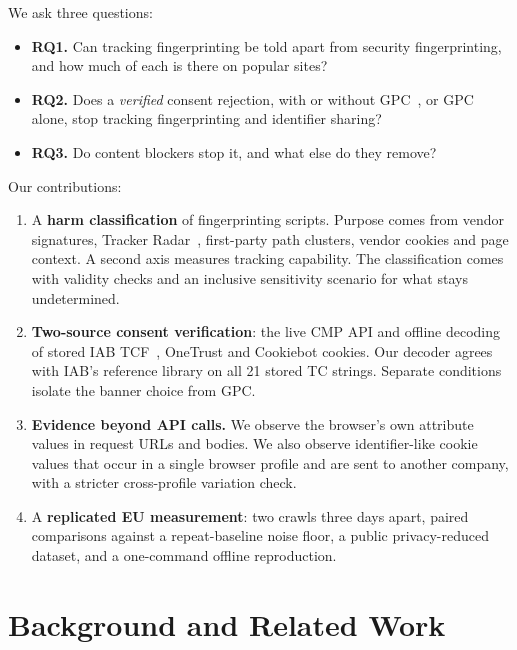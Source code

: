 \documentclass[sigconf,review,anonymous]{acmart}
\begin{document}
We ask three questions:
\begin{itemize}
\item \textbf{RQ1.} Can tracking fingerprinting be told apart from security fingerprinting, and
  how much of each is there on popular sites?
\item \textbf{RQ2.} Does a \emph{verified} consent rejection, with or without GPC~\cite{gpcspec},
  or GPC alone, stop tracking fingerprinting and identifier sharing?
\item \textbf{RQ3.} Do content blockers stop it, and what else do they remove?
\end{itemize}

\noindent Our contributions:
\begin{enumerate}
\item A \textbf{harm classification} of fingerprinting scripts. Purpose comes from vendor
  signatures, Tracker Radar~\cite{trackerradar}, first-party path clusters, vendor cookies and
  page context. A second axis measures tracking capability. The classification comes with
  validity checks and an inclusive sensitivity scenario for what stays undetermined.
\item \textbf{Two-source consent verification}: the live CMP API and offline decoding of stored
  IAB TCF~\cite{iabtcf}, OneTrust and Cookiebot cookies. Our decoder agrees with IAB's reference
  library on all 21 stored TC strings. Separate conditions isolate the banner choice from GPC.
\item \textbf{Evidence beyond API calls.} We observe the browser's own attribute values in
  request URLs and bodies. We also observe identifier-like cookie values that occur in a single
  browser profile and are sent to another company, with a stricter cross-profile variation check.
\item A \textbf{replicated EU measurement}: two crawls three days apart, paired comparisons
  against a repeat-baseline noise floor, a public privacy-reduced dataset, and a one-command
  offline reproduction.
\end{enumerate}

\section{Background and Related Work}
\end{document}
